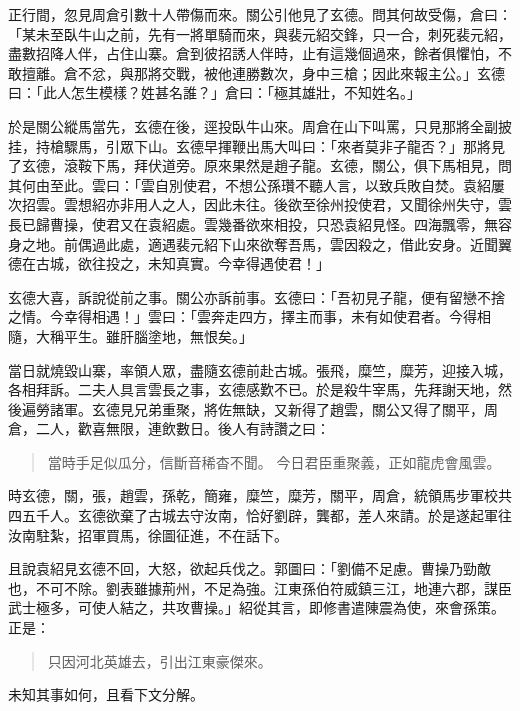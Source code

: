 正行間，忽見周倉引數十人帶傷而來。關公引他見了玄德。問其何故受傷，倉曰：「某未至臥牛山之前，先有一將單騎而來，與裴元紹交鋒，只一合，刺死裴元紹，盡數招降人伴，占住山寨。倉到彼招誘人伴時，止有這幾個過來，餘者俱懼怕，不敢擅離。倉不忿，與那將交戰，被他連勝數次，身中三槍；因此來報主公。」玄德曰：「此人怎生模樣？姓甚名誰？」倉曰：「極其雄壯，不知姓名。」

於是關公縱馬當先，玄德在後，逕投臥牛山來。周倉在山下叫罵，只見那將全副披挂，持槍驟馬，引眾下山。玄德早揮鞭出馬大叫曰：「來者莫非子龍否？」那將見了玄德，滾鞍下馬，拜伏道旁。原來果然是趙子龍。玄德，關公，俱下馬相見，問其何由至此。雲曰：「雲自別使君，不想公孫瓚不聽人言，以致兵敗自焚。袁紹屢次招雲。雲想紹亦非用人之人，因此未往。後欲至徐州投使君，又聞徐州失守，雲長已歸曹操，使君又在袁紹處。雲幾番欲來相投，只恐袁紹見怪。四海飄零，無容身之地。前偶過此處，適遇裴元紹下山來欲奪吾馬，雲因殺之，借此安身。近聞翼德在古城，欲往投之，未知真實。今幸得遇使君！」

玄德大喜，訴說從前之事。關公亦訴前事。玄德曰：「吾初見子龍，便有留戀不捨之情。今幸得相遇！」雲曰：「雲奔走四方，擇主而事，未有如使君者。今得相隨，大稱平生。雖肝腦塗地，無恨矣。」

當日就燒毀山寨，率領人眾，盡隨玄德前赴古城。張飛，糜竺，糜芳，迎接入城，各相拜訴。二夫人具言雲長之事，玄德感歎不已。於是殺牛宰馬，先拜謝天地，然後遍勞諸軍。玄德見兄弟重聚，將佐無缺，又新得了趙雲，關公又得了關平，周倉，二人，歡喜無限，連飲數日。後人有詩讚之曰：

\begin{quote}
當時手足似瓜分，信斷音稀杳不聞。
今日君臣重聚義，正如龍虎會風雲。
\end{quote}

時玄德，關，張，趙雲，孫乾，簡雍，糜竺，糜芳，關平，周倉，統領馬步軍校共四五千人。玄德欲棄了古城去守汝南，恰好劉辟，龔都，差人來請。於是遂起軍往汝南駐紮，招軍買馬，徐圖征進，不在話下。

且說袁紹見玄德不回，大怒，欲起兵伐之。郭圖曰：「劉備不足慮。曹操乃勁敵也，不可不除。劉表雖據荊州，不足為強。江東孫伯符威鎮三江，地連六郡，謀臣武士極多，可使人結之，共攻曹操。」紹從其言，即修書遣陳震為使，來會孫策。正是：

\begin{quote}
只因河北英雄去，引出江東豪傑來。
\end{quote}

未知其事如何，且看下文分解。
